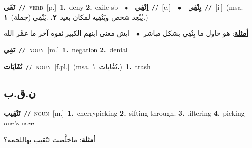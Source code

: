 \documentclass[10pt,a4paper,twoside]{article} %
\begin{document}
\begin{multicols}{2}
{\setlength\topsep{0pt}\textbf{\foreignlanguage{arabic}{نَفَى}}\ {\color{gray}\texttt{//}\color{black}}\ \textsc{verb}\ [p.]\ \textbf{1.}~deny  \textbf{2.}~exile sb\ \ $\bullet$\ \ \setlength\topsep{0pt}\textbf{\foreignlanguage{arabic}{اِنْفِي}}\ {\color{gray}\texttt{//}\color{black}}\ [c.]\ \ $\bullet$\ \ \setlength\topsep{0pt}\textbf{\foreignlanguage{arabic}{يِنْفِي}}\ {\color{gray}\texttt{//}\color{black}}\ [i.]\ \color{gray}(msa. \foreignlanguage{arabic}{يُبْعِد شخص ويَنْفِيه لمكان بعيد}~\foreignlanguage{arabic}{\textbf{٢.}}  .\foreignlanguage{arabic}{يَنْفِي (جملة)}~\foreignlanguage{arabic}{\textbf{١.}})\color{black}\  \begin{flushright}\color{gray}\foreignlanguage{arabic}{\textbf{\underline{\foreignlanguage{arabic}{أمثلة}}}: هو حاول ما يِنْفِي بشكل مباشر\ $\bullet$\ \  ايش معنى ابنهم الكبير نَفوه آخر ما عمَّر الله}\end{flushright}\color{black}} \vspace{2mm}

{\setlength\topsep{0pt}\textbf{\foreignlanguage{arabic}{نَفِي}}\ {\color{gray}\texttt{//}\color{black}}\ \textsc{noun}\ [m.]\ \textbf{1.}~negation  \textbf{2.}~denial\ } \vspace{2mm}

{\setlength\topsep{0pt}\textbf{\foreignlanguage{arabic}{نُفَايَات}}\ {\color{gray}\texttt{//}\color{black}}\ \textsc{noun}\ [f.pl.]\ \color{gray}(msa. \foreignlanguage{arabic}{نُفُايات}~\foreignlanguage{arabic}{\textbf{١.}})\color{black}\ \textbf{1.}~trash\ } \vspace{2mm}

\vspace{-3mm}
\subsection*{\color{blue}\foreignlanguage{arabic}{ن.ق.ب}\color{blue}{}} 

{\setlength\topsep{0pt}\textbf{\foreignlanguage{arabic}{تَنْقِيب}}\ {\color{gray}\texttt{//}\color{black}}\ \textsc{noun}\ [m.]\ \textbf{1.}~cherrypicking  \textbf{2.}~sifting through.  \textbf{3.}~filtering  \textbf{4.}~picking one's nose\  \begin{flushright}\color{gray}\foreignlanguage{arabic}{\textbf{\underline{\foreignlanguage{arabic}{أمثلة}}}: ماخلَّصت تَنْقيب بهاللحمة؟}\end{flushright}\color{black}} \vspace{2mm}


\end{multicols}
\end{document}
